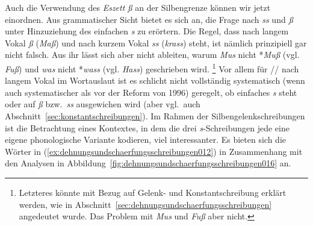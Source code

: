 Auch die Verwendung des \textit{Eszett} \textit{ß} an der Silbengrenze können wir jetzt einordnen.
Aus grammatischer Sicht bietet es sich an, die Frage nach \textit{ss} und \textit{ß} unter Hinzuziehung des einfachen \textit{s} zu erörtern.
Die Regel, dass nach langem Vokal \textit{ß} (\textit{Maß}) und nach kurzem Vokal \textit{ss} (\textit{krass}) steht, ist nämlich prinzipiell gar nicht falsch.
Aus ihr lässt sich aber nicht ableiten, warum \zB \textit{Mus} nicht *\textit{Muß} (vgl. \textit{Fuß}) und \textit{was} nicht *\textit{wass} (vgl. \textit{Hass}) geschrieben wird.%
\footnote{Letzteres könnte mit Bezug auf Gelenk- und Konstantschreibung erklärt werden, wie in Abschnitt~\ref{sec:dehnungsundschaerfungsschreibungen} angedeutet wurde.
Das Problem mit \textit{Mus} und \textit{Fuß} aber nicht.}
Vor allem für // nach langem Vokal im Wortauslaut ist es schlicht nicht vollständig systematisch (wenn auch systematischer als vor der Reform von 1996) geregelt, ob einfaches \textit{s} steht oder auf \textit{ß} bzw.\ \textit{ss} ausgewichen wird (aber vgl.\ auch Abschnitt~\ref{sec:konstantschreibungen}).
Im Rahmen der Silbengelenkschreibungen ist die Betrachtung eines Kontextes, in dem die drei \textit{s}-Schreibungen jede eine eigene phonologische Variante kodieren, viel interessanter.
Es bieten sich die Wörter in (\ref{ex:dehnungsundschaerfungsschreibungen012}) in Zusammenhang mit den Analysen in Abbildung~\ref{fig:dehnungsundschaerfungsschreibungen016} an.

\begin{exe}
  \ex\label{ex:dehnungsundschaerfungsschreibungen012}
  \begin{xlist}
  \end{xlist}
\end{exe}

